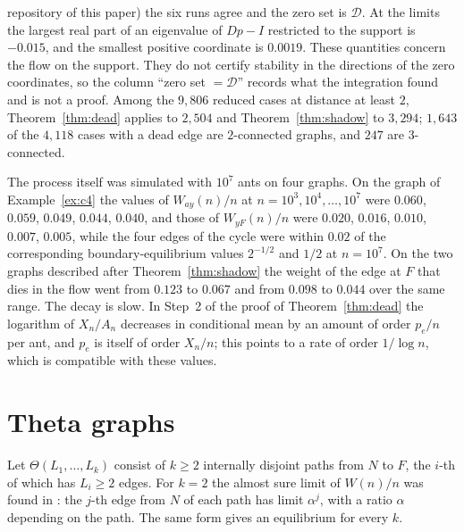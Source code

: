 \documentclass[11pt]{amsart}
\theoremstyle{remark}
\begin{document}
repository of this paper) the six runs agree and the zero set is $\mathcal D$. At the limits the largest real part of
an eigenvalue of $Dp-I$ restricted to the support is $-0.015$, and the smallest positive coordinate is $0.0019$. These
quantities concern the flow on the support. They do not certify stability in the directions of the zero coordinates,
so the column ``zero set $=\mathcal D$'' records what the integration found and is not a proof. Among the $9{,}806$
reduced cases at distance at least $2$, Theorem~\ref{thm:dead} applies to $2{,}504$ and Theorem~\ref{thm:shadow} to
$3{,}294$; $1{,}643$ of the $4{,}118$ cases with a dead edge are $2$-connected graphs, and $247$ are $3$-connected.

The process itself was simulated with $10^7$ ants on four graphs. On the graph of Example~\ref{ex:c4} the values of
$W_{ay}(n)/n$ at $n=10^3,10^4,\dots,10^7$ were $0.060$, $0.059$, $0.049$, $0.044$, $0.040$, and those of
$W_{yF}(n)/n$ were $0.020$, $0.016$, $0.010$, $0.007$, $0.005$, while the four edges of the cycle were within $0.02$
of the corresponding boundary-equilibrium values $2^{-1/2}$ and $1/2$ at $n=10^7$. On the two graphs described after Theorem~\ref{thm:shadow} the
weight of the edge at $F$ that dies in the flow went from $0.123$ to $0.067$ and from $0.098$ to $0.044$ over the same
range. The decay is slow. In Step~2 of the proof of Theorem~\ref{thm:dead} the logarithm of $X_n/A_n$ decreases in
conditional mean by an amount of order $p_e/n$ per ant, and $p_e$ is itself of order $X_n/n$; this points to a rate of
order $1/\log n$, which is compatible with these values.
\section{Theta graphs}\label{sec:theta}

Let $\Theta(L_1,\dots,L_k)$ consist of $k\ge2$ internally disjoint paths from $N$ to $F$, the $i$-th of which has
$L_i\ge2$ edges. For $k=2$ the almost sure limit of $W(n)/n$ was found in \cite[Theorem 1.5]{KMS}: the $j$-th edge
from $N$ of each path has limit $\alpha^j$, with a ratio $\alpha$ depending on the path. The same form gives an
equilibrium for every $k$.
\end{document}
